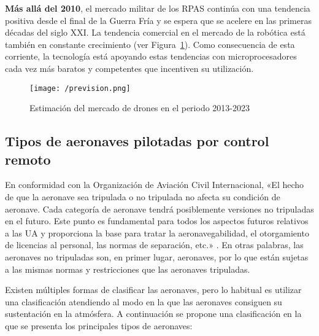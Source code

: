 \textbf{Más allá del 2010}, el mercado militar de los \acs{RPAS} continúa con una tendencia positiva desde el final de la Guerra Fría y se espera que se acelere en las primeras décadas del siglo XXI. La tendencia comercial en el mercado de la robótica está también en constante crecimiento (ver Figura~\ref{fig:prevision}). Como consecuencia de esta corriente, la tecnología está apoyando estas tendencias con microprocesadores cada vez más baratos y competentes que incentiven su utilización.

\begin{figure}[!h]
\begin{center}
\texttt{[image: /prevision.png]}
\caption[Estimación del mercado de drones en el periodo 2013-2023]{Estimación del mercado de drones en el periodo 2013-2023 \cite{prevision}}
\label{fig:prevision}
\end{center}
\end{figure}

\subsection{Tipos de aeronaves pilotadas por control remoto}
\label{sec:tipos}

En conformidad con la Organización de Aviación Civil Internacional, «El hecho de que la aeronave sea tripulada o no tripulada no afecta su condición de aeronave. Cada categoría de aeronave tendrá posiblemente versiones no tripuladas en el futuro.
Este punto es fundamental para todos los aspectos futuros relativos a las \acs{UA} y proporciona la base para tratar la aeronavegabilidad, el otorgamiento de licencias al personal, las normas de separación, etc.» \cite{OACI}. En otras palabras, las aeronaves no tripuladas son, en primer lugar, aeronaves, por lo que están sujetas a las mismas normas y restricciones que las aeronaves tripuladas.

Existen múltiples formas de clasificar las aeronaves, pero lo habitual es utilizar una clasificación atendiendo al modo en la que las aeronaves consiguen su sustentación en la atmósfera. A continuación se propone una clasificación en la que se presenta los principales tipos de aeronaves: 

